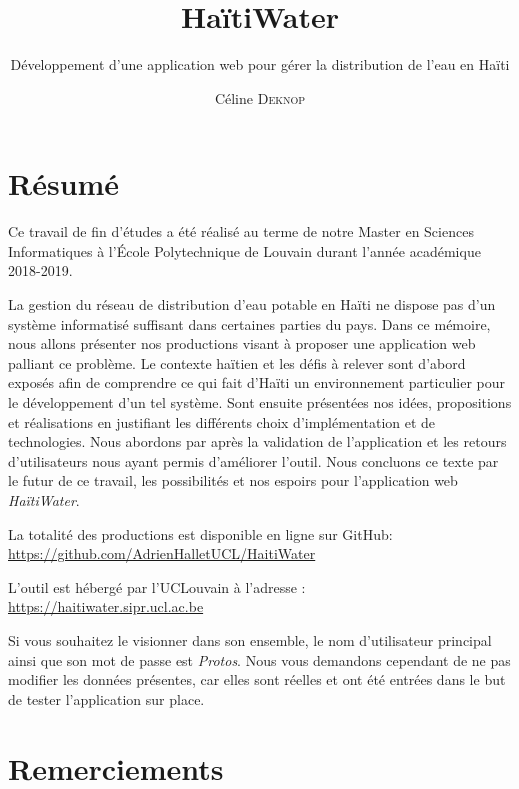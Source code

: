 \documentclass{EPL-master-thesis-covers-FR}
\title{HaïtiWater}
\subtitle{Développement d'une application web pour gérer la distribution de l'eau en Haïti}
\author{Céline \textsc{Deknop}}
\begin{document}
	\maketitle
	\tableofcontents

	\setlength{\parskip}{1.5em plus1em minus1em}


	\chapter*{Résumé}

		Ce travail de fin d'études a été réalisé au terme de notre Master en Sciences Informatiques à l'École Polytechnique de Louvain durant l'année académique 2018-2019.

		La gestion du réseau de distribution d'eau potable en Haïti ne dispose pas d'un système informatisé suffisant dans certaines parties du pays. Dans ce mémoire, nous allons présenter nos productions visant à proposer une application web palliant ce problème. Le contexte haïtien et les défis à relever sont d'abord exposés afin de comprendre ce qui fait d'Haïti un environnement particulier pour le développement d'un tel système. Sont ensuite présentées nos idées, propositions et réalisations en justifiant les différents choix d'implémentation et de technologies. Nous abordons par après la validation de l'application et les retours d'utilisateurs nous ayant permis d'améliorer l'outil. Nous concluons ce texte par le futur de ce travail, les possibilités et nos espoirs pour l'application web \emph{HaïtiWater}.

		La totalité des productions est disponible en ligne sur GitHub:\\ \url{https://github.com/AdrienHalletUCL/HaitiWater}

		L'outil est hébergé par l'UCLouvain à l'adresse : \\ \url{https://haitiwater.sipr.ucl.ac.be}

		Si vous souhaitez le visionner dans son ensemble, le nom d'utilisateur principal ainsi que son mot de passe est \emph{Protos}. Nous vous demandons cependant de ne pas modifier les données présentes, car elles sont réelles et ont été entrées dans le but de tester l'application sur place.

	\chapter*{Remerciements}
\end{document}
